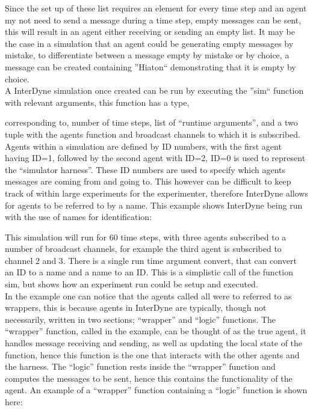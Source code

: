 \documentclass{article}
\begin{document}
Since the set up of these list requires an element for every time step and an agent my not need to send a message during a time step, empty messages can be sent, this will result in an agent either receiving or sending an empty list. It may be the case in a simulation that an agent could be generating empty messages by mistake, to differentiate between a message empty by mistake or by choice, a message can be created containing ''Hiaton`` demonstrating that it is empty by choice.\\   
A InterDyne simulation once created can be run by executing the ''sim`` function with relevant arguments, this function has a type,      

corresponding to, number of time steps, list of ``runtime arguments'', and a two tuple with the agents function and broadcast channels to which it is subscribed.\\
Agents within a simulation are defined by ID numbers, with the first agent having ID=1, followed by the second agent with ID=2,  ID=0 is used to represent the ``simulator harness''. These ID numbers are used to specify which agents messages are coming from and going to. This however can be difficult to keep track of within large experiments for the experimenter, therefore InterDyne allows for agents to be referred to by a name. This example shows InterDyne being run with the use of names for identification:     

This simulation will run for 60 time steps, with three agents subscribed to a number of broadcast channels, for example the third agent is subscribed to channel 2 and 3. There is a single run time argument convert, that can convert an ID to a name and a name to an ID. This is a simplistic call of the function sim, but shows how an experiment run could be setup and executed.\\   
In the example one can notice that the agents called all were to referred to as wrappers, this is because agents in InterDyne are typically, though not necessarily, written in two sections; ``wrapper'' and ``logic'' functions. The ``wrapper'' function, called in the example, can be thought of as the true agent, it handles message receiving and sending, as well as updating the local state of the function, hence this function is the one that interacts with the other agents and the harness. The ``logic'' function rests inside the ``wrapper'' function and computes the messages to be sent, hence this contains the functionality of the agent. An example of a ``wrapper'' function containing a ``logic'' function is shown here:
\end{document}
